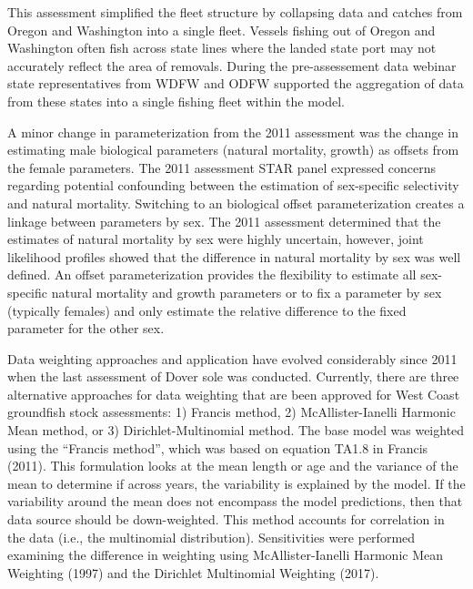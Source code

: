 \documentclass[11pt,
  english,
  a4paper,
]{article}
\begin{document}
\leavevmode\tagmcend\tagstructend\par


This assessment simplified the fleet structure by collapsing data and catches from Oregon and Washington into a single fleet. Vessels fishing out of Oregon and Washington often fish across state lines where the landed state port may not accurately reflect the area of removals. During the pre-assessement data webinar state representatives from WDFW and ODFW supported the aggregation of data from these states into a single fishing fleet within the model.

\leavevmode\tagmcend\tagstructend\par


A minor change in parameterization from the 2011 assessment was the change in estimating male biological parameters (natural mortality, growth) as offsets from the female parameters. The 2011 assessment STAR panel expressed concerns regarding potential confounding between the estimation of sex-specific selectivity and natural mortality. Switching to an biological offset parameterization creates a linkage between parameters by sex. The 2011 assessment determined that the estimates of natural mortality by sex were highly uncertain, however, joint likelihood profiles showed that the difference in natural mortality by sex was well defined. An offset parameterization provides the flexibility to estimate all sex-specific natural mortality and growth parameters or to fix a parameter by sex (typically females) and only estimate the relative difference to the fixed parameter for the other sex.

\leavevmode\tagmcend\tagstructend\par


Data weighting approaches and application have evolved considerably since 2011 when the last assessment of Dover sole was conducted. Currently, there are three alternative approaches for data weighting that are been approved for West Coast groundfish stock assessments: 1) Francis method, 2) McAllister-Ianelli Harmonic Mean method, or 3) Dirichlet-Multinomial method. The base model was weighted using the ``Francis method'', which was based on equation TA1.8 in Francis {(2011)\leavevmode\tagmcend\tagstructend}. This formulation looks at the mean length or age and the variance of the mean to determine if across years, the variability is explained by the model. If the variability around the mean does not encompass the model predictions, then that data source should be down-weighted. This method accounts for correlation in the data (i.e., the multinomial distribution). Sensitivities were performed examining the difference in weighting using McAllister-Ianelli Harmonic Mean Weighting {(1997)\leavevmode\tagmcend\tagstructend} and the Dirichlet Multinomial Weighting {(2017)\leavevmode\tagmcend\tagstructend}.
\end{document}
